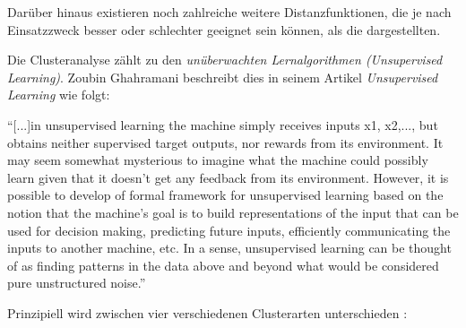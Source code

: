 Darüber hinaus existieren noch zahlreiche weitere Distanzfunktionen, die je nach Einsatzzweck besser oder schlechter geeignet sein können, als die dargestellten. 


\newpage


Die Clusteranalyse zählt zu den \textit{unüberwachten Lernalgorithmen (Unsupervised Learning)}. Zoubin Ghahramani beschreibt dies in seinem Artikel \textit{Unsupervised Learning}  wie folgt: 

\enquote{[...]in unsupervised learning the machine simply receives inputs x1, x2,..., but obtains neither supervised target outputs, nor rewards from its environment. It may seem somewhat mysterious to imagine what the machine could possibly learn given that it doesn’t get any feedback from its environment. However, it is possible to develop of formal framework for unsupervised learning based on the notion that the machine’s goal is to build representations of the input that can be used for decision making, predicting future inputs, efficiently communicating the inputs to another machine, etc. In a sense, unsupervised learning can be thought of as finding patterns in the data above and beyond what would be considered pure unstructured noise.}

Prinzipiell wird zwischen vier verschiedenen Clusterarten unterschieden : 

